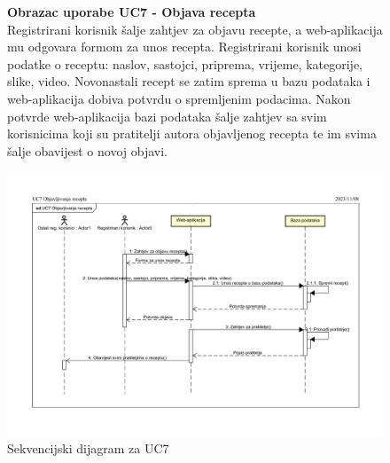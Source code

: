 			\begin{figure}[H]
				\textbf{Obrazac uporabe UC7 - Objava recepta}\\

				Registrirani korisnik šalje zahtjev za objavu recepte, a web-aplikacija mu odgovara formom za unos recepta. Registrirani korisnik unosi podatke o receptu: naslov, sastojci, priprema, vrijeme, kategorije, slike, video. Novonastali recept se zatim sprema u bazu podataka i web-aplikacija dobiva potvrdu o spremljenim podacima. Nakon potvrde web-aplikacija bazi podataka šalje zahtjev sa svim korisnicima koji su pratitelji autora objavljenog recepta te im svima šalje obavijest o novoj objavi.
				\begin{center}
					\includegraphics[scale = 0.8]{slike/SEK_UC7_Objavljivanje_recepta.png}
					\caption{Sekvencijski dijagram za UC7}
					\label{fig:Sek_UC7}							
				\end{center}
			\end{figure}


